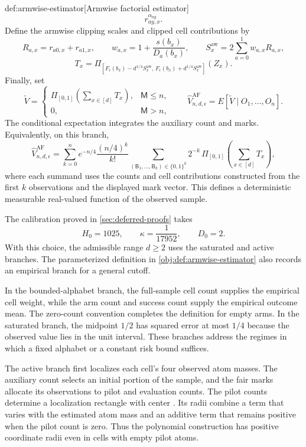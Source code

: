 \begin{algorithmv}{def:armwise-estimator}[Armwise factorial estimator]
\[{r_{ay,x}^{\alpha_{ay}}}.
\]
Define the armwise clipping scales and clipped cell contributions by
\[
R_{a,x}=r_{a0,x}+r_{a1,x},\qquad
w_{a,x}=1+\frac{s(b_x)}{D_a(b_x)},\qquad
S_x^{\mathrm{aw}}=2\sum_{a=0}^{1}w_{a,x}R_{a,x},
\]
\[
T_x
=
\Pi_{[F_\epsilon(b_x)-d^{1/4}S_x^{\mathrm{aw}},\,
       F_\epsilon(b_x)+d^{1/4}S_x^{\mathrm{aw}}]}(Z_x).
\]
Finally, set
\[
\widetilde V
=
\begin{cases}
\displaystyle\Pi_{[0,1]}\left(\sum_{x\in[d]}T_x\right),
&\mathsf M\le n,\\[4pt]
0,&\mathsf M>n,
\end{cases}
\qquad
\widehat V_{n,d,\epsilon}^{\mathrm{AF}}
=
E[\widetilde V\mid O_1,\ldots,O_n].
\]
The conditional expectation integrates the auxiliary count and marks. Equivalently, on this branch,
\[
\widehat V_{n,d,\epsilon}^{\mathrm{AF}}
=
\sum_{k=0}^{n}
e^{-n/4}\frac{(n/4)^k}{k!}
\sum_{(\mathsf B_1,\ldots,\mathsf B_k)\in\{0,1\}^k}
2^{-k}\,
\Pi_{[0,1]}\left(\sum_{x\in[d]}T_x\right),
\]
where each summand uses the counts and cell contributions constructed from the first \(k\) observations and the displayed mark vector. This defines a deterministic measurable real-valued function of the observed sample.
\end{algorithmv}

The calibration proved in \cref{sec:deferred-proofs} takes
\[
H_0=1025,
\qquad
\kappa=\frac1{17952},
\qquad
D_0=2.
\]
With this choice, the admissible range \(d\ge2\) uses the saturated and active branches. The parameterized definition in \cref{obj:def:armwise-estimator} also records an empirical branch for a general cutoff.

In the bounded-alphabet branch, the full-sample cell count  supplies the empirical cell weight, while the arm count  and success count  supply the empirical outcome mean. The zero-count convention completes the definition for empty arms. In the saturated branch, the midpoint \(1/2\) has squared error at most \(1/4\) because the observed value lies in the unit interval. These branches address the regimes in which a fixed alphabet or a constant risk bound suffices.

The active branch first localizes each cell's four observed atom masses. The auxiliary count  selects an initial portion of the sample, and the fair marks  allocate its observations to pilot and evaluation counts. The pilot counts  determine a localization rectangle  with center . Its radii combine a term that varies with the estimated atom mass and an additive term that remains positive when the pilot count is zero. Thus the polynomial construction has positive coordinate radii even in cells with empty pilot atoms.

